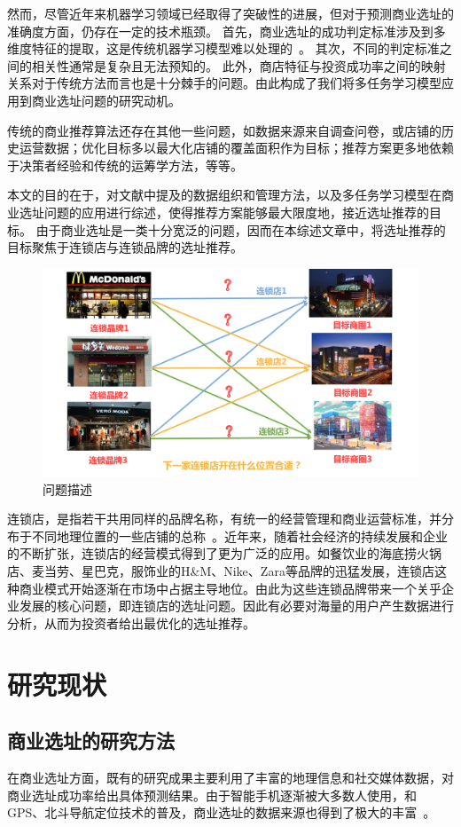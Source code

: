 \documentclass{llncs}
\begin{document}
然而，尽管近年来机器学习领域已经取得了突破性的进展，但对于预测商业选址的准确度方面，仍存在一定的技术瓶颈。
首先，商业选址的成功判定标准涉及到多维度特征的提取，这是传统机器学习模型难以处理的~\cite{ZhouLiuCai}。
其次，不同的判定标准之间的相关性通常是复杂且无法预知的。
此外，商店特征与投资成功率之间的映射关系对于传统方法而言也是十分棘手的问题。由此构成了我们将多任务学习模型应用到商业选址问题的研究动机。

传统的商业推荐算法还存在其他一些问题，如数据来源来自调查问卷，或店铺的历史运营数据；优化目标多以最大化店铺的覆盖面积作为目标；推荐方案更多地依赖于决策者经验和传统的运筹学方法，等等。

本文的目的在于，对文献中提及的数据组织和管理方法，以及多任务学习模型在商业选址问题的应用进行综述，使得推荐方案能够最大限度地，接近选址推荐的目标。
由于商业选址是一类十分宽泛的问题，因而在本综述文章中，将选址推荐的目标聚焦于连锁店与连锁品牌的选址推荐。
\begin{figure}
	\centering
	\includegraphics[width=0.8\columnwidth]{figures/intro.png}
	\caption{问题描述}
	\label{intro}
\end{figure}

连锁店，是指若干共用同样的品牌名称，有统一的经营管理和商业运营标准，并分布于不同地理位置的一些店铺的总称~\cite{DongHongAn}。近年来，随着社会经济的持续发展和企业的不断扩张，连锁店的经营模式得到了更为广泛的应用。如餐饮业的海底捞火锅店、麦当劳、星巴克，服饰业的H\&M、Nike、Zara等品牌的迅猛发展，连锁店这种商业模式开始逐渐在市场中占据主导地位。由此为这些连锁品牌带来一个关乎企业发展的核心问题，即连锁店的选址问题。因此有必要对海量的用户产生数据进行分析，从而为投资者给出最优化的选址推荐。


\section{研究现状}
\subsection{商业选址的研究方法}
在商业选址方面，既有的研究成果主要利用了丰富的地理信息和社交媒体数据，对商业选址成功率给出具体预测结果。由于智能手机逐渐被大多数人使用，和GPS、北斗导航定位技术的普及，商业选址的数据来源也得到了极大的丰富~\cite{zhao2017mining}。
\end{document}
